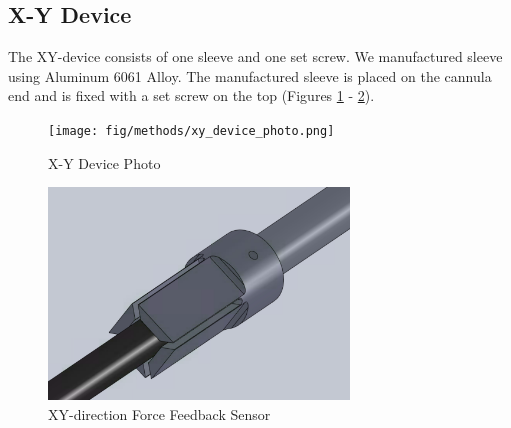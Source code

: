 \subsection{X-Y Device}
\label{sec:xyDir}

The XY-device consists of one sleeve and one set screw. We manufactured sleeve using Aluminum 6061 Alloy. %
The manufactured sleeve is placed on the cannula end and is fixed with a set screw on the top (Figures \ref{fig:xy_photo} - \ref{fig:xy-direction}).

\begin{figure}[h]
	\begin{center}
		\texttt{[image: fig/methods/xy\_device\_photo.png]}
	\end{center}
	\vspace{-4mm}
	\caption[X-Y Device]
	{X-Y Device Photo}
	\label{fig:xy_photo}
	\vspace{-2mm}
\end{figure}

\begin{figure}[h]
	\begin{center}
		\includegraphics[width=80mm]{fig/methods/xy_dev_cl.png}
	\end{center}
	\vspace{-4mm}
	\caption[XY-direction Force Feedback Sensor]
	{XY-direction Force Feedback Sensor}
	\label{fig:xy-direction}
	\vspace{-2mm}
\end{figure}

